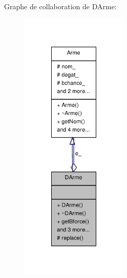 Graphe de collaboration de D\-Arme\-:
\nopagebreak
\begin{figure}[H]
\begin{center}
\leavevmode
\includegraphics[width=144pt]{class_d_arme__coll__graph}
\end{center}
\end{figure}
